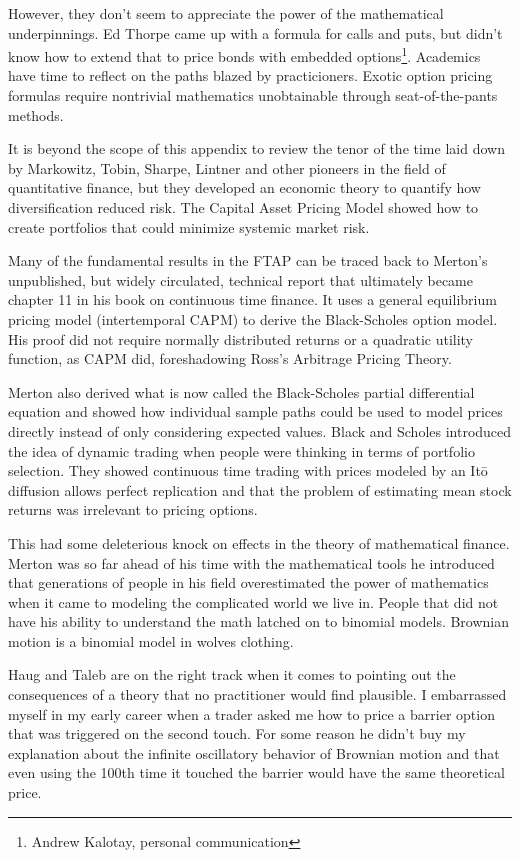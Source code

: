 \documentclass[fleqn]{amsart}
\begin{document}
However, they don't seem to appreciate the power of the mathematical
underpinnings. Ed Thorpe came up with a formula for calls and puts,
but didn't know how to extend that to price bonds with embedded
options\footnote{Andrew Kalotay, personal communication}. 
Academics have time to reflect on the paths blazed
by practicioners.
Exotic option pricing formulas require nontrivial
mathematics unobtainable through seat-of-the-pants methods.

It is beyond the scope of this appendix to review the tenor of the
time laid down by Markowitz\cite{Mar1952}, Tobin\cite{Tob1958}, Sharpe\cite{Sha1964}, Lintner\cite{Lin1965} and other pioneers 
in the field of quantitative finance, but they developed an
economic theory to quantify how diversification reduced risk. The
Capital Asset Pricing Model showed how
to create portfolios that could minimize systemic market risk.

Many of the fundamental results in the FTAP can be traced back
to Merton's unpublished, but widely circulated,
technical report\cite{Mer1970} that ultimately became chapter 11 in
his book on continuous time finance\cite{Mer1992}.
It uses a general equilibrium pricing model (intertemporal CAPM) 
to derive the Black-Scholes option model. His proof
did not require normally distributed returns or a quadratic
utility function, as CAPM did, foreshadowing Ross's Arbitrage
Pricing Theory\cite{Ros1976}.

Merton also derived what is now called the Black-Scholes partial
differential equation and showed
how individual sample paths could be used to model
prices directly instead of only considering expected values.
Black and Scholes introduced the idea of dynamic trading
when people were thinking in terms of portfolio selection.
They showed continuous time trading with
prices modeled by an It\=o diffusion allows perfect
replication and that the problem of estimating mean stock returns
was irrelevant to pricing options.

This had some deleterious knock on effects in the theory
of mathematical finance. Merton was so far ahead of his time
with the mathematical tools he introduced that generations
of people in his field overestimated the power of
mathematics when it came to modeling the complicated world
we live in. People that did not have his ability to understand
the math latched on to binomial models. Brownian motion is
a binomial model in wolves clothing. 

Haug and Taleb are on the right track when it comes to pointing
out the consequences of a theory that no practitioner would
find plausible. I embarrassed myself in my early career
when a trader asked me how to price a barrier option that was
triggered on the second touch. For some reason he
didn't buy my explanation about the infinite oscillatory behavior of
Brownian motion and that even using the 100th time it touched the barrier
would have the same theoretical price.
\end{document}
